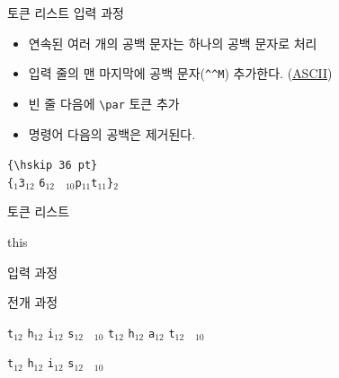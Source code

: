 \documentclass{beamer}
\begin{document}
%
\begin{frame}[fragile]{토큰 리스트}
  \alert{입력 과정}

  \begin{itemize}
  \item 연속된 여러 개의 공백 문자는 하나의 공백 문자로 처리
  \item 입력 줄의 맨 마지막에 공백 문자(\verb+^^M+) 추가한다.
    (\href{http://www.asciitable.com}{ASCII})
  \item 빈 줄 다음에 \verb+\par+ 토큰 추가
  \item 명령어 다음의 공백은 제거된다.
  \end{itemize}
  
  \verb*+{\hskip 36 pt}+\\
  \bigskip
  \verb|{|$_1$\quad{}\quad\verb|3|$_{12}$
  \quad\verb|6|$_{12}$\quad
  \verb*| |$_{10}$\quad\verb|p|$_{11}$\quad\verb|t|$_{11}$\quad\verb|}|$_{2}$
\end{frame}


%
\begin{frame}[fragile]{토큰 리스트}
\begin{verbatim*}
\def\tokentwo{\iftrue this \else that \fi}
\tokentwo
\end{verbatim*}
    \bigskip
    \alert{입력 과정}
    
    
    \bigskip
    \alert{전개 과정}
    
    \quad
    \verb|t|$_{12}$\quad
    \verb|h|$_{12}$\quad
    \verb|i|$_{12}$\quad
    \verb|s|$_{12}$\quad
    \verb*| |$_{10}$\quad
    \quad
    \verb|t|$_{12}$\quad
    \verb|h|$_{12}$\quad
    \verb|a|$_{12}$\quad
    \verb|t|$_{12}$\quad
    \verb*| |$_{10}$\quad

    \bigskip
    \verb|t|$_{12}$\quad
    \verb|h|$_{12}$\quad
    \verb|i|$_{12}$\quad
    \verb|s|$_{12}$\quad
    \verb*| |$_{10}$\quad
\end{frame}
\end{document}
